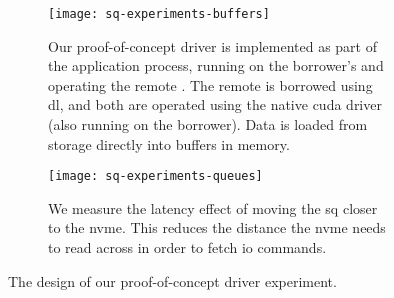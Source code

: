 \begin{figure}
    \centering
    \begin{subfigure}{\linewidth}
        \centering
        \texttt{[image: sq-experiments-buffers]}
        \caption%
        {Our proof-of-concept  driver is implemented as part of the application process, running on the borrower's  and operating the remote . The remote  is borrowed using \gls{dl}, and both  are operated using the native \gls{cuda} driver (also running on the borrower). Data is loaded from storage directly into buffers in  memory.}
        \label{fig:eval-nvme-workload}
    \end{subfigure}
    \par\vspace{10mm}
    \begin{subfigure}{\linewidth}
        \centering
        \texttt{[image: sq-experiments-queues]}
        \caption%
        {We measure the latency effect of moving the \gls{sq} closer to the \gls{nvme}. This reduces the distance the \gls{nvme} needs to read across in order to fetch \gls{io} commands.}
        \label{fig:eval-nvme-scenarios}
    \end{subfigure}
    \caption[The design of our proof-of-concept  driver experiment]
    {The design of our proof-of-concept  driver experiment.}
    \label{fig:eval-nvme-design}
\end{figure}





